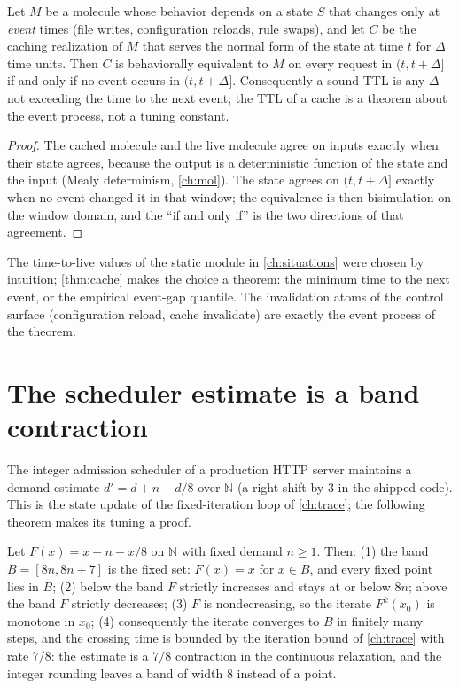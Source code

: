 \begin{theorem}\label{thm:61}\label{thm:cache}
Let $M$ be a molecule whose behavior depends on a state $S$ that
changes only at \emph{event} times (file writes, configuration
reloads, rule swaps), and let $C$ be the caching realization of $M$
that serves the normal form of the state at time $t$ for $\Delta$ time
units. Then $C$ is behaviorally equivalent to $M$ on every request in
$(t, t+\Delta]$ if and only if no event occurs in $(t, t+\Delta]$.
Consequently a sound TTL is any $\Delta$ not exceeding the time to the
next event; the TTL of a cache is a theorem about the event process,
not a tuning constant.
\end{theorem}

\begin{proof}
The cached molecule and the live molecule agree on inputs exactly when
their state agrees, because the output is a deterministic function of
the state and the input (Mealy determinism, \autoref{ch:mol}). The
state agrees on $(t, t+\Delta]$ exactly when no event changed it in
that window; the equivalence is then bisimulation on the window
domain, and the ``if and only if'' is the two directions of that
agreement.
\end{proof}

\begin{remark}
The time-to-live values of the static module in \autoref{ch:situations}
were chosen by intuition; \autoref{thm:cache} makes the choice a
theorem: the minimum time to the next event, or the empirical
event-gap quantile. The invalidation atoms of the control surface
(configuration reload, cache invalidate) are exactly the event process
of the theorem.
\end{remark}

\section{The scheduler estimate is a band contraction}\label{sec:scheduler}

The integer admission scheduler of a production HTTP server maintains
a demand estimate $d' = d + n - d/8$ over $\mathbb{N}$ (a right shift
by 3 in the shipped code). This is the state update of the
fixed-iteration loop of \autoref{ch:trace}; the following theorem makes
its tuning a proof.

\begin{theorem}\label{thm:62}\label{thm:ema}
Let $F (x) = x + n - x/8$ on $\mathbb{N}$ with fixed demand
$n \geq 1$. Then:
(1) the band $B = [8n, 8n+7]$ is the fixed set: $F (x) = x$ for
$x \in B$, and every fixed point lies in $B$;
(2) below the band $F$ strictly increases and stays at or below $8n$;
above the band $F$ strictly decreases;
(3) $F$ is nondecreasing, so the iterate $F^{k} (x_0)$ is monotone in
$x_0$;
(4) consequently the iterate converges to $B$ in finitely many steps,
and the crossing time is bounded by the iteration bound of
\autoref{ch:trace} with rate $7/8$: the estimate is a $7/8$
contraction in the continuous relaxation, and the integer rounding
leaves a band of width $8$ instead of a point.
\end{theorem}


